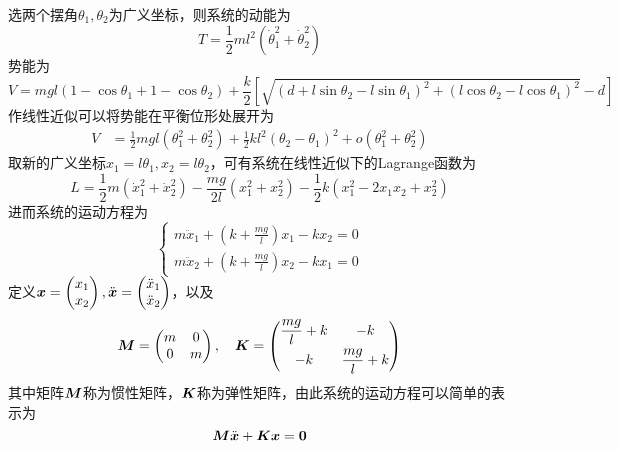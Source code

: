 \begin{example}[弹性耦合摆]
选两个摆角$\theta_1,\theta_2$为广义坐标，则系统的动能为
\begin{equation*}
	T = \frac12 ml^2 \left(\dot{\theta}_1^2+\dot{\theta}_2^2\right)
\end{equation*}
势能为
\begin{equation*}
	V = mgl(1-\cos \theta_1+ 1-\cos \theta_2) + \frac{k}{2} \left[\sqrt{(d+l\sin \theta_2-l\sin \theta_1)^2+(l\cos \theta_2-l\cos \theta_1)^2} - d\right]
\end{equation*}
作线性近似可以将势能在平衡位形处展开为
\begin{align*}
	V & = \frac12 mgl(\theta_1^2+\theta_2^2) + \frac12 kl^2 (\theta_2-\theta_1)^2 + o(\theta_1^2+\theta_2^2)
\end{align*}
取新的广义坐标$x_1 = l\theta_1,x_2 = l\theta_2$，可有系统在线性近似下的Lagrange函数为
\begin{equation*}
	L = \frac12 m(\dot{x}_1^2+\dot{x}_2^2) - \frac{mg}{2l} (x_1^2+x_2^2) - \frac12 k(x_1^2-2x_1x_2+x_2^2)
\end{equation*}
进而系统的运动方程为
\begin{equation*}
	\begin{cases}
		\displaystyle m\ddot{x}_1 + \left(k +\frac{mg}{l}\right) x_1 - kx_2 = 0 \\[1.5ex]
		\displaystyle m\ddot{x}_2 + \left(k +\frac{mg}{l}\right) x_2 - kx_1 = 0
	\end{cases}
\end{equation*}
定义$\boldsymbol{x} = \begin{pmatrix} x_1 \\ x_2 \end{pmatrix},\ddot{\boldsymbol{x}} = \begin{pmatrix} \ddot{x}_1 \\ \ddot{x}_2 \end{pmatrix}$，以及
\begin{equation*}
	\boldsymbol{M} = \begin{pmatrix} m & 0 \\ 0 & m \end{pmatrix},\quad \boldsymbol{K} = \begin{pmatrix} \dfrac{mg}{l}+k & -k \\[1.5ex] -k & \dfrac{mg}{l} + k \end{pmatrix}
\end{equation*}
其中矩阵$\boldsymbol{M}$称为{\heiti 惯性矩阵}，$\boldsymbol{K}$称为{\heiti 弹性矩阵}，由此系统的运动方程可以简单的表示为
\begin{equation*}
	\mbf{M} \ddot{\mbf{x}} + \mbf{K} \mbf{x} = \mbf{0}

\end{equation*}
\end{example}
